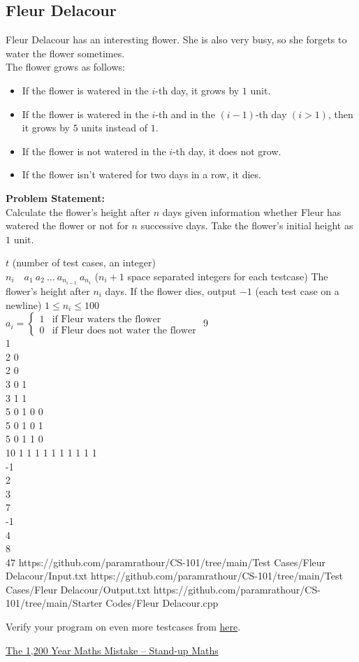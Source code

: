 \documentclass[../../Problems]{subfiles}
\begin{document}
\subsection{Fleur Delacour}
Fleur Delacour has an interesting flower. She is also very busy, so  she forgets to water the flower sometimes.\\
The flower grows as follows:
\vspace{-0.5em}
\begin{itemize}
\item If the flower is watered in the $i$-th day, it grows by $1$ unit.
\item If the flower is watered in the $i$-th and in the $(i-1)$-th day $(i>1)$, then it grows by $5$ units instead of $1$.
\item If the flower is not watered in the $i$-th day, it does not grow.
\item If the flower isn't watered for two days in a row, it dies.
\end{itemize}
\textbf{Problem Statement:}\\
Calculate the flower's height after $n$ days given information whether Fleur has watered the flower or not for $n$ successive days. Take the flower's initial height as $1$ unit.
\vspace{-0.5em}
\begin{testcasesMore}
	{$t$ \hfill(number of test cases, an integer)\\
	$n_i\quad a_{1}\ a_{2}\ \ldots\ a_{n_{i-1}}\ a_{n_i}$ \hfill($n_i+1$ space separated integers for each testcase)}
	{The flower's height after $n_i$ days. If the flower dies, output $-1$ \hfill(each test case on a newline)}
	{$1 \leq n_i \leq 100$\\[0.5em]
	$
	a_i = \begin{cases} 
      1 & \text{if Fleur waters the flower}\\
      0 & \text{if Fleur does not water the flower}
   \end{cases}
	$}
	{9\\1\\2 0\\2 0\\3 0 1\\3 1 1\\5 0 1 0 0\\5 0 1 0 1\\5 0 1 1 0\\10 1 1 1 1 1 1 1 1 1}
	{1\\-1\\2\\3\\7\\-1\\4\\8\\47}
	{https://github.com/paramrathour/CS-101/tree/main/Test Cases/Fleur Delacour/Input.txt}
	{https://github.com/paramrathour/CS-101/tree/main/Test Cases/Fleur Delacour/Output.txt}
	{https://github.com/paramrathour/CS-101/tree/main/Starter Codes/Fleur Delacour.cpp}
\end{testcasesMore}
\begin{note}
	Verify your program on even more testcases from \href{https://codeforces.com/problemset/problem/1585/A}{here}.
\end{note}
\begin{funvideo}
\href{https://youtu.be/FAdmpAZTH_M}{The 1,200 Year Maths Mistake -- Stand-up Maths}
\end{funvideo}
\end{document}
